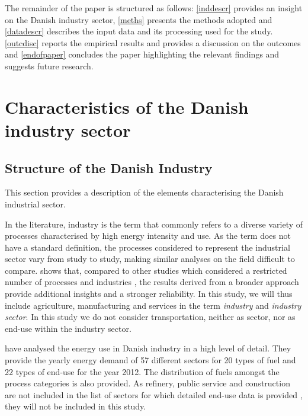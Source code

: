 \documentclass[review]{elsarticle}
\begin{document}
The remainder of the paper is structured as follows: \autoref{inddescr} provides an insight on the Danish industry sector, \autoref{meths} presents the methods adopted and \autoref{datadescr} describes the input data and its processing used for the study. \autoref{outcdisc} reports the empirical results and provides a discussion on the outcomes and \autoref{endofpaper} concludes the paper highlighting the relevant findings and suggests future research.

\section{Characteristics of the Danish industry sector} \label{inddescr}

\subsection{Structure of the Danish Industry}
This section provides a description of the elements characterising the Danish industrial sector.

In the literature, industry is the term that commonly refers to a diverse variety of processes characterised by high energy intensity and use. As the term does not have a standard definition, the processes considered to represent the industrial sector vary from study to study, making similar analyses on the field difficult to compare. \cite{Buhler2016} shows that, compared to other studies which considered a restricted number of processes and industries \cite{Oladiran2007,Al-Ghandoor2010,Dincer2003,Sanaei2012}, the results derived from a broader approach provide additional insights and a stronger reliability. In this study, we will thus include agriculture, manufacturing and services in the term \textit{industry} and \textit{industry sector}. In this study we do not consider transportation, neither as sector, nor as end-use within the industry sector. 

\cite{VM2015} have analysed the energy use in Danish industry in a high level of detail. They provide the yearly energy demand of 57 different sectors for 20 types of fuel and 22 types of end-use for the year 2012. The distribution of fuels amongst the process categories is also provided. As refinery, public service and construction are not included in the list of sectors for which detailed end-use data is provided \cite{VM2015}, they will not be included in this study.
\end{document}
